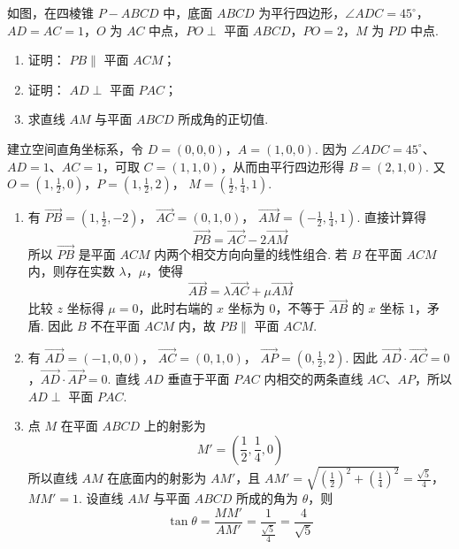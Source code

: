 \begin{problem}
如图，在四棱锥 \(P - ABCD\) 中，底面 \(ABCD\) 为平行四边形，\(\angle ADC = 45^{\circ}\)，\(AD = AC = 1\)，\(O\) 为 \(AC\) 中点，\(PO \perp\) 平面 \(ABCD\)，\(PO = 2\)，\(M\) 为 \(PD\) 中点.
\begin{enumerate}
\item 证明： \(PB \parallel\) 平面 \(ACM\)；
\item 证明： \(AD \perp\) 平面 \(PAC\)；
\item 求直线 \(AM\) 与平面 \(ABCD\) 所成角的正切值.
\end{enumerate}

\end{problem}

\begin{solution}
建立空间直角坐标系，令 \(D=(0,0,0)\)，\(A=(1,0,0)\). 因为 \(\angle ADC=45^\circ\)、\(AD=1\)、\(AC=1\)，可取 \(C=(1,1,0)\)，从而由平行四边形得 \(B=(2,1,0)\). 又 \(O=\left(1,\frac12,0\right)\)，\(P=\left(1,\frac12,2\right)\)，
\(M=\left(\frac12,\frac14,1\right)\).
\begin{enumerate}
\item 有 \(\overrightarrow{PB}=(1,\frac12,-2)\)，
\(\overrightarrow{AC}=(0,1,0)\)，
\(\overrightarrow{AM}=(-\frac12,\frac14,1)\).
直接计算得
\[
\overrightarrow{PB}=\overrightarrow{AC}-2\overrightarrow{AM}
\]
所以 \(\overrightarrow{PB}\) 是平面 \(ACM\) 内两个相交方向向量的线性组合. 若 \(B\) 在平面 \(ACM\) 内，则存在实数 \(\lambda\)，\(\mu\)，使得
\[
\overrightarrow{AB}=\lambda\overrightarrow{AC}+\mu\overrightarrow{AM}
\]
比较 \(z\) 坐标得 \(\mu=0\)，此时右端的 \(x\) 坐标为 \(0\)，不等于 \(\overrightarrow{AB}\) 的 \(x\) 坐标 \(1\)，矛盾. 因此 \(B\) 不在平面 \(ACM\) 内，故 \(PB\parallel\) 平面 \(ACM\).

\item 有 \(\overrightarrow{AD}=(-1,0,0)\)，
\(\overrightarrow{AC}=(0,1,0)\)，
\(\overrightarrow{AP}=(0,\frac12,2)\).
因此 \(\overrightarrow{AD}\cdot\overrightarrow{AC}=0\)，\(\overrightarrow{AD}\cdot\overrightarrow{AP}=0\). 直线 \(AD\) 垂直于平面 \(PAC\) 内相交的两条直线 \(AC\)、\(AP\)，所以 \(AD\perp\) 平面 \(PAC\).

\item 点 \(M\) 在平面 \(ABCD\) 上的射影为
\[
M'=\left(\frac12,\frac14,0\right)
\]
所以直线 \(AM\) 在底面内的射影为 \(AM'\)，且 \(AM'=\sqrt{\left(\frac12\right)^2+\left(\frac14\right)^2}=\frac{\sqrt5}{4}\)，
\(MM'=1\).
设直线 \(AM\) 与平面 \(ABCD\) 所成的角为 \(\theta\)，则
\[
\tan\theta=\frac{MM'}{AM'}=\frac{1}{\frac{\sqrt5}{4}}=\frac{4}{\sqrt5}
\]
\end{enumerate}
\end{solution}

